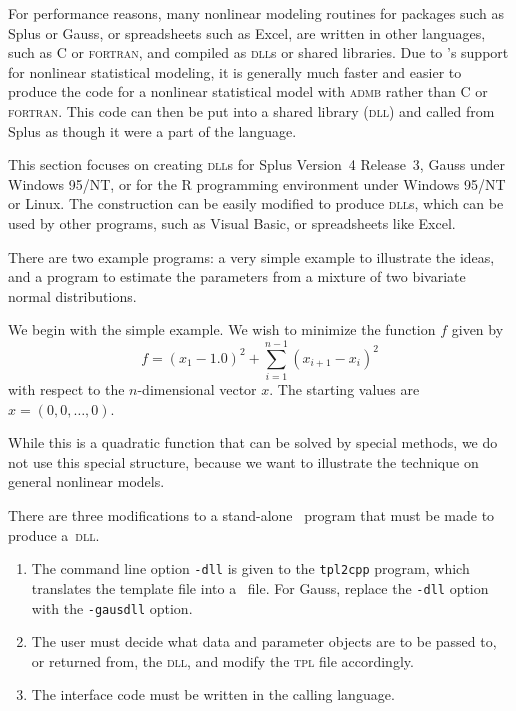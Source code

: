 %
%

For performance reasons, many nonlinear modeling routines for packages
such as Splus or Gauss, or spreadsheets such as Excel,
are written in other languages, such as C or \textsc{fortran}, and
compiled as \textsc{dll}s or shared libraries. Due to 
\ADM's support for nonlinear statistical modeling, it
is generally much faster and easier to produce the code for
a nonlinear statistical model with \textsc{admb} rather than C or \textsc{fortran}.
This code can then be put into a shared library (\textsc{dll}) and called
from Splus as though it were a part of the language. 

This section focuses on creating \textsc{dll}s for Splus Version~4 Release~3, Gauss
under Windows 95/NT,
or for the R programming environment under Windows 95/NT or Linux. 
The construction can be easily modified to produce \textsc{dll}s, which can be
used by other programs, such as Visual Basic, or spreadsheets like Excel.

There are two example programs: a very 
simple example to illustrate the ideas,
and a program to estimate the parameters from a mixture of two bivariate
normal distributions.
 
We begin with the simple example. We
wish to minimize the function $f$ given by
$$ f=(x_1-1.0)^2+\sum_{i=1}^{n-1}(x_{i+1}-x_i)^2$$
with respect to the $n$-dimensional vector $x$. The
starting values are $x=(0,0,\ldots,0)$.
   
While this is a quadratic function that can be solved by special methods,
we do not use this special structure, because we want to illustrate
the technique on general nonlinear models. 

There are three modifications to a stand-alone \ADM\ program
that must be made to produce a~\textsc{dll}.
\begin{enumerate}

\item The command line option \texttt{-dll} is given to the
\texttt{tpl2cpp} program, which translates the template file into a
\cplus\ file. For Gauss, replace the \texttt{-dll} option with
the \texttt{-gausdll} option.

\item The user must decide what data and parameter
objects are to be passed to, or returned from, the \textsc{dll},
and modify the \textsc{tpl} file accordingly.

\item The interface code must be written in the
calling language. 
\end{enumerate}

